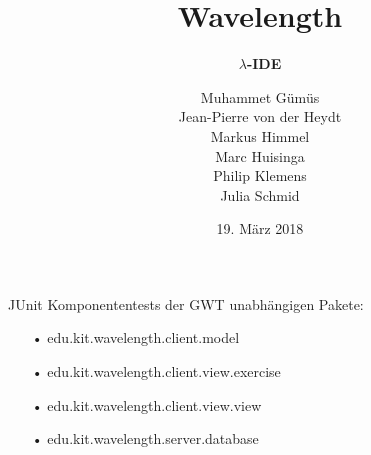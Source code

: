 \documentclass[10pt]{beamer}
\title[] %
{ %
      \textbf{Wavelength}
}
\subtitle[$\lambda$-IDE]
{
      \textbf{$\lambda$-IDE}
}
\author[wavelength]
{     
      Muhammet Gümüs \\
      Jean-Pierre von der Heydt \\  
       Markus Himmel \\
       Marc Huisinga \\
       Philip Klemens \\ 
       Julia Schmid   }
\institute[]
{
      
  
}
\date{19. März 2018}
\begin{document}

{
\begin{frame}[plain]
\maketitle
\end{frame}
}

\begin{frame}{JUnit}%
Komponententests der GWT unabhängigen Pakete:
\begin{itemize}
\item[•] edu.kit.wavelength.client.model
\item[•] edu.kit.wavelength.client.view.exercise
\item[•] edu.kit.wavelength.client.view.view
\item[•] edu.kit.wavelength.server.database
\end{itemize}

\end{frame}
\end{document}
